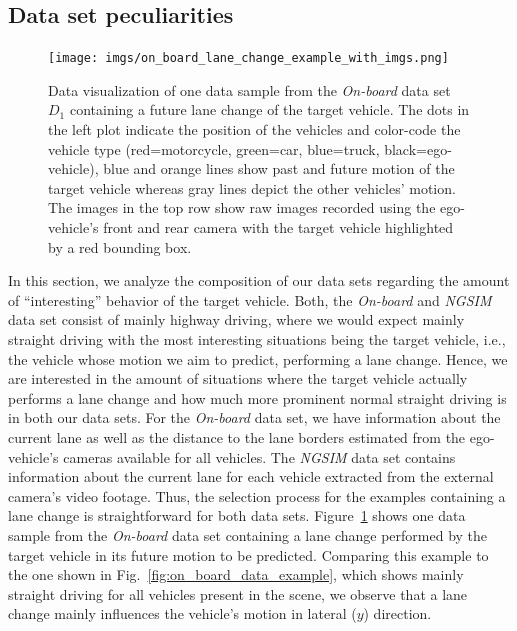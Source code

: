 \subsection{Data set peculiarities}%
\label{subsec:data_set_peculiarities}

\begin{figure}[t]
    \centering
    \texttt{[image: imgs/on\_board\_lane\_change\_example\_with\_imgs.png]}
    \caption{Data visualization of one data sample from the \emph{On-board} data set $D_1$ containing a future lane change of the target vehicle.
        The dots in the left plot indicate the position of the vehicles and color-code the vehicle type (red=motorcycle, green=car, blue=truck, black=ego-vehicle), blue and orange lines show past and future motion of the target vehicle whereas gray lines depict the other vehicles' motion.
        The images in the top row show raw images recorded using the ego-vehicle's front and rear camera with the target vehicle highlighted by a red bounding box.}
    \label{fig:on_board_lane_change_example_with_imgs}
\end{figure}

In this section, we analyze the composition of our data sets regarding the amount of \enquote{interesting} behavior of the target vehicle.
Both, the \emph{On-board} and \emph{\ac{NGSIM}} data set consist of mainly highway driving, where we would expect mainly straight driving with the most interesting situations being the target vehicle, i.e., the vehicle whose motion we aim to predict, performing a lane change.
Hence, we are interested in the amount of situations where the target vehicle actually performs a lane change and how much more prominent normal straight driving is in both our data sets.
For the \emph{On-board} data set, we have information about the current lane as well as the distance to the lane borders estimated from the ego-vehicle's cameras available for all vehicles.
The \emph{\ac{NGSIM}} data set contains information about the current lane for each vehicle extracted from the external camera's video footage.
Thus, the selection process for the examples containing a lane change is straightforward for both data sets.
Figure~\ref{fig:on_board_lane_change_example_with_imgs} shows one data sample from the \emph{On-board} data set containing a lane change performed by the target vehicle in its future motion to be predicted.
Comparing this example to the one shown in Fig.~\ref{fig:on_board_data_example}, which shows mainly straight driving for all vehicles present in the scene, we observe that a lane change mainly influences the vehicle's motion in lateral ($y$) direction.

